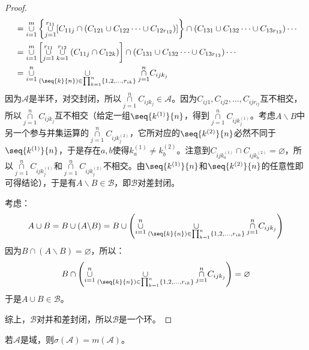 \begin{proof}
\begin{align*}
		&=\underset{i=1}{\overset{m}{\cup}}\left\{\underset{j=1}{\overset{r_{11}}{\cup}}[C_{11j}\cap(C_{121}\cup C_{122}\cdots\cup C_{12r_{12}})]\right\}\cap(C_{131}\cup C_{132}\cdots\cup C_{13r_{13}})\cdots \\
		&=\underset{i=1}{\overset{m}{\cup}}\left[\underset{j=1}{\overset{r_{11}}{\cup}}\underset{k=1}{\overset{r_{12}}{\cup}}(C_{11j}\cap C_{12k})\right]\cap(C_{131}\cup C_{132}\cdots\cup C_{13r_{13}})\cdots \\
		&=\underset{i=1}{\overset{n}{\cup}}\underset{(\seq{k}{n})\in\prod_{k=1}^{n}\{1,2,\dots,r_{ik}\}}{\overset{}{\cup}}\underset{j=1}{\overset{n}{\cap}}C_{ijk_j}
	\end{align*}
	因为$\mathscr{A}$是半环，对交封闭，所以$\underset{j=1}{\overset{n}{\cap}}C_{ijk_j}\in \mathscr{A}$。因为$C_{ij1},C_{ij2},\dots,C_{ijr_{ij}}$互不相交，所以$\underset{j=1}{\overset{n}{\cap}}C_{ijk_j}$互不相交（给定一组$\seq{k^{(1)}}{n}$，得到$\underset{j=1}{\overset{n}{\cap}}C_{ijk^{(1)}_j}$。考虑$A\backslash B$中另一个参与并集运算的$\underset{j=1}{\overset{n}{\cap}}C_{ijk^{(2)}_j}$，它所对应的$\seq{k^{(2)}}{n}$必然不同于$\seq{k^{(1)}}{n}$，于是存在$a,b$使得$k^{(1)}_a\ne k^{(2)}_b$。注意到$C_{ijk^{(1)}_a}\cap C_{ijk^{(2)}_b}=\varnothing$，所以$\underset{j=1}{\overset{n}{\cap}}C_{ijk^{(1)}_j}$和$\underset{j=1}{\overset{n}{\cap}}C_{ijk^{(2)}_j}$不相交。由$\seq{k^{(1)}}{n}$和$\seq{k^{(2)}}{n}$的任意性即可得结论），于是有$A\backslash B\in \mathscr{B}$，即$\mathscr{B}$对差封闭。\par
	考虑：
	\begin{equation*}
		A\cup B=B\cup(A\backslash B)=B\cup\left(\underset{i=1}{\overset{n}{\cup}}\underset{(\seq{k}{n})\in\prod_{k=1}^{n}\{1,2,\dots,r_{ik}\}}{\overset{}{\cup}}\underset{j=1}{\overset{n}{\cap}}C_{ijk_j}\right)
	\end{equation*}
	因为$B\cap (A\backslash B)=\varnothing$，所以：
	\begin{equation*}
		B\cap\left(\underset{i=1}{\overset{n}{\cup}}\underset{(\seq{k}{n})\in\prod_{k=1}^{n}\{1,2,\dots,r_{ik}\}}{\overset{}{\cup}}\underset{j=1}{\overset{n}{\cap}}C_{ijk_j}\right)=\varnothing
	\end{equation*}
	于是$A\cup B\in \mathscr{B}$。\par
	综上，$\mathscr{B}$对并和差封闭，所以$\mathscr{B}$是一个环。
\end{proof}
\begin{theorem}\label{theo:SigmaField=MonotoneField}
	若$\mathscr{A}$是域，则$\sigma(\mathscr{A})=m(\mathscr{A})$。
\end{theorem}
